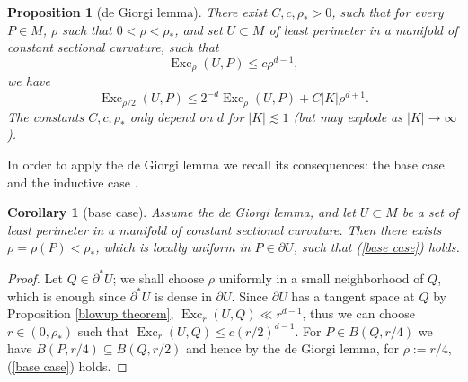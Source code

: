 \documentclass[reqno,10pt]{amsart}
\DeclareMathOperator{\Exc}{Exc}
\newtheorem{proposition}[theorem]{Proposition}
\newtheorem{corollary}[theorem]{Corollary}
\theoremstyle{definition}
\numberwithin{equation}{section}
\begin{document}
\begin{proposition}[de Giorgi lemma]\label{de Giorgi}
There exist $C, c, \rho_* > 0$, such that for every $P \in M$, $\rho$ such that $0 < \rho < \rho_*$, and set $U \subset M$ of least perimeter in a manifold of constant sectional curvature, such that
\begin{equation}\label{base case}
\Exc_\rho(U, P) \leq c\rho^{d - 1},
\end{equation}
we have
\begin{equation}\label{dGL concl}
\Exc_{\rho/2}(U, P) \leq 2^{-d} \Exc_\rho(U, P) + C|K|\rho^{d + 1}.
\end{equation}
The constants $C, c, \rho_*$ only depend on $d$ for $|K| \lesssim 1$ (but may explode as $|K| \to \infty$).
\end{proposition}

In order to apply the de Giorgi lemma we recall its consequences: the base case \cite[pg109]{Giusti77} and the inductive case \cite[Corollary 8.3]{Giusti77}.

\begin{corollary}[base case]
Assume the de Giorgi lemma, and let $U \subset M$ be a set of least perimeter in a manifold of constant sectional curvature.
Then there exists $\rho  = \rho(P) < \rho_*$, which is locally uniform in $P \in \partial U$, such that (\ref{base case}) holds.
\end{corollary}
\begin{proof}
Let $Q \in \partial^* U$; we shall choose $\rho$ uniformly in a small neighborhood of $Q$, which is enough since $\partial^* U$ is dense in $\partial U$.
Since $\partial U$ has a tangent space at $Q$ by Proposition \ref{blowup theorem}, $\Exc_r(U, Q) \ll r^{d - 1}$, thus we can choose $r \in (0, \rho_*)$ such that $\Exc_r(U, Q) \leq c(r/2)^{d - 1}$.
For $P \in B(Q, r/4)$ we have $B(P, r/4) \subseteq B(Q, r/2)$ and hence by the de Giorgi lemma, for $\rho := r/4$, (\ref{base case}) holds.
\end{proof}
\end{document}
